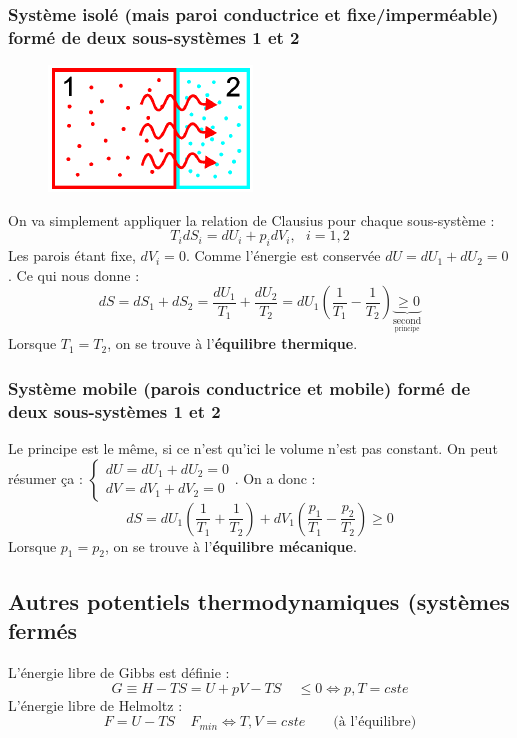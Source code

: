 \documentclass[11pt, a4paper, openany]{book}
\begin{document}
\subsubsection{Système isolé (mais paroi conductrice et fixe/imperméable) formé de deux sous-systèmes 1  et 2}
\begin{figure}
\includegraphics[scale=0.5]{cp/image3.png}
\end{figure}
On va simplement appliquer la relation de Clausius pour chaque sous-système :
\begin{equation}
T_idS_i = dU_i + p_idV_i, \ \ \ i= 1,2
\end{equation}
Les parois étant fixe, $dV_i = 0$. Comme l'énergie est conservée $dU = dU_1 +dU_2 = 0$. Ce qui nous donne : 
\begin{equation}
dS = dS_1+dS_2 = \frac{dU_1}{T_1} + \frac{dU_2}{T_2} = dU_1\left(\frac{1}{T_1} - \frac{1}{T_2}\right) \underbrace{\geq 0}_{\underset{\text{principe}}{\text{second}}}
\end{equation}
Lorsque $T_1 = T_2$, on se trouve à l'\textbf{équilibre thermique}.

\subsubsection{Système mobile (parois conductrice et mobile) formé de deux sous-systèmes 1 et 2}
Le principe est le même, si ce n'est qu'ici le volume n'est pas constant. On peut résumer ça : $\left\{\begin{array}{l}
dU = dU_1 + dU_2 = 0\\
dV = dV_1 + dV_2 = 0
\end{array}\right.$. On a donc :
\begin{equation}
dS = dU_1\left(\frac{1}{T_1}+\frac{1}{T_2}\right) + dV_1\left(\frac{p_1}{T_1} - \frac{p_2}{T_2}\right)  \geq 0
\end{equation}
Lorsque $p_1 = p_2$, on se trouve à l'\textbf{équilibre mécanique}.


\subsection{Autres potentiels thermodynamiques (systèmes fermés}
L'énergie libre de Gibbs est définie : 
\begin{equation}
G \equiv H - TS = U + pV - TS\ \ \ \ \ \leq 0 \Leftrightarrow p, T = cste
\end{equation}
L'énergie libre de Helmoltz :
\begin{equation}
F = U - TS\ \ \ \ \ F_{min} \Leftrightarrow T, V = cste\qquad\text{(à l'équilibre)}
\end{equation}
\end{document}
